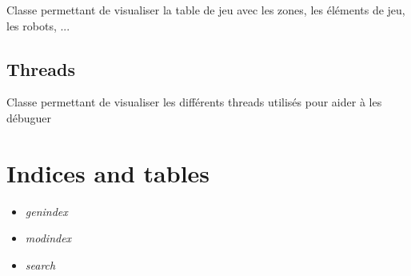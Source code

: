 \documentclass[letterpaper,10pt,french]{sphinxmanual}
\begin{document}
\begin{fulllineitems}
\label{visualisation:lib.visualisation.visu_table.Visu_table}
Classe permettant de visualiser la table de jeu avec les zones, les éléments de jeu, les robots, ...

\end{fulllineitems}



\section{Threads}
\label{visualisation:module-lib.visualisation.visu_threads}\label{visualisation:threads}

\begin{fulllineitems}
\label{visualisation:lib.visualisation.visu_threads.Visu_threads}
Classe permettant de visualiser les différents threads utilisés pour aider à les débuguer

\end{fulllineitems}



\chapter{Indices and tables}
\label{index:indices-and-tables}\begin{itemize}
\item {} 
\emph{genindex}

\item {} 
\emph{modindex}

\item {} 
\emph{search}

\end{itemize}
\end{document}
